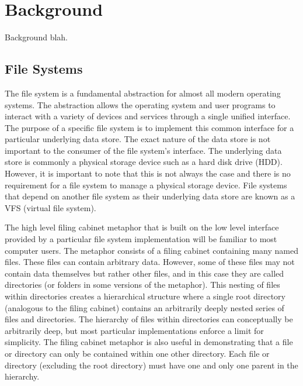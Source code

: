\chapter{Background}
\vspace{1cm}

Background blah.

\section{File Systems}


The file system is a fundamental abstraction for almost all modern operating
systems. The abstraction allows the operating system and user programs to
interact with a variety of devices and services through a single unified
interface.
The purpose of a specific file system is to implement this common interface for
a particular underlying data store. The exact nature of the data store is not
important to the consumer of the file system's interface. The underlying data
store is commonly a physical storage device such as a hard disk drive (HDD).
However, it is important to note that this is not always the case and there is
no requirement for a file system to manage a physical storage device. File
systems that depend on another file system as their underlying data store are
known as a VFS (virtual file system).

The high level filing cabinet metaphor that is built on the low level interface
provided by a particular file system implementation will be familiar to most
computer users. The metaphor consists of a filing cabinet containing many named
files. These files can contain arbitrary data. However, some of these files may
not contain data themselves but rather other files, and in this case they are
called directories (or folders in some versions of the metaphor). This nesting
of files within directories creates a hierarchical structure where a single
root directory (analogous to the filing cabinet) contains an arbitrarily
deeply nested series of files and directories. The hierarchy of files within
directories can conceptually be arbitrarily deep, but most particular
implementations enforce a limit for simplicity. The filing cabinet metaphor is
also useful in demonstrating that a file or directory can only be contained
within one other directory. Each file or directory (excluding the root
directory) must have one and only one parent in the hierarchy.

